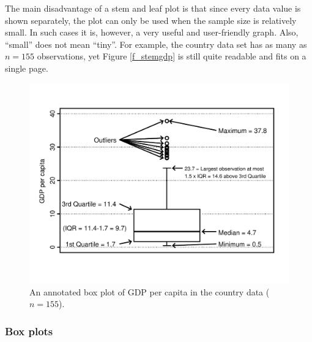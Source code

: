 The main disadvantage of a stem and leaf plot is that since every data
value is shown separately, the plot can only be used when the sample
size is relatively small. In such cases it is, however, a
very useful and user-friendly graph. Also, ``small'' does not mean
``tiny''. For example, the country data set has as many as $n=155$
observations, yet Figure \ref{f_stemgdp} is still quite readable and fits on a
single page.

\begin{figure}[t]
\caption{An annotated box plot of GDP per capita in the country data
($n=155$).}
\label{f_boxplot_gdp}
\begin{center}
\vspace*{-8ex}
\includegraphics[width=15cm]{box_gdp}
\vspace*{-3ex}
\end{center}
\end{figure}

\subsubsection{Box plots}

